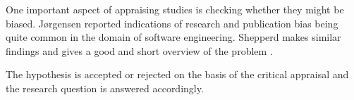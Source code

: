 One important aspect of appraising studies is checking whether they might be biased. J{\o}rgensen \etal \cite{Jorgensen2016} reported indications of research and publication bias being quite common in the domain of software engineering. Shepperd makes similar findings and gives a good and short overview of the problem \cite{Shepperd2015}.

The hypothesis is accepted or rejected on the basis of the critical appraisal and the research question is answered accordingly.


